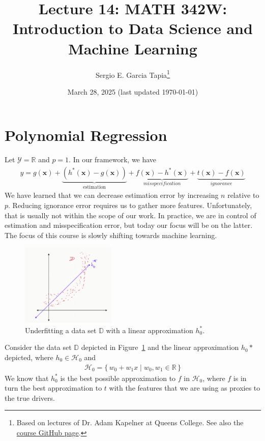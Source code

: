 \documentclass[12pt, a4paper]{article}
\title{Lecture 14: MATH 342W: Introduction to Data Science and Machine Learning}
\author{Sergio E. Garcia Tapia\thanks{Based on lectures of Dr. Adam Kapelner at Queens College.
See also the \href{https://github.com/kapelner/QC_MATH_342W_Spring_2025}{course GitHub page}.}}
\date{March 28, 2025 (last updated \today)}
\theoremstyle{definition}
\begin{document}
	\maketitle
	\section*{Polynomial Regression}
	Let $\mathcal{Y}=\mathbb{R}$ and $p=1$. In our framework, we have
	\begin{align*}
		y = g(\bm{x}) + 
		\underbrace{(h^*(\bm{x}) - g(\bm{x}))}_{{\text{estimation}}} + 
		\underbrace{f(\bm{x}) - h^*(\bm{x})}_{\textit{misspecification}} +
		\underbrace{t(\bm{x}) - f(\bm{x})}_{\textit{ignorance}}
	\end{align*}
	We have learned that we can decrease estimation error by increasing $n$ relative
	to $p$. Reducing ignorance error requires us to gather more features. Unfortunately,
	that is usually not within the scope of our work. In practice, we are in control
	of estimation and misspecification error, but today our focus will be on the latter.
	The focus of this course is slowly shifting towards machine learning.
	
	
	\begin{figure}
		\centering
		\includegraphics[width=0.4\textwidth]{underfit-with-linear-function}
		\caption{Underfitting a data set $\mathbb{D}$ with a linear approximation
		$h_0^*$.}
		\label{fig:underfit-D-with-linear}
	\end{figure}
	
	Consider the data set $\mathbb{D}$ depicted in Figure~\ref{fig:underfit-D-with-linear}
	and the linear approximation $h_0*$ depicted, where $h_0\in \mathcal{H}_0$ and
	\begin{align*}
		\mathcal{H}_0 =\{\, w_0+w_1x \mid w_0,w_1\in \mathbb{R}\,\} 
	\end{align*}
	We know that $h_0^*$ is the best possible approximation to $f$ in $\mathcal{H}_0$, where
	$f$ is in turn the best approximation to $t$ with the features that we are using as proxies
	to the true drivers.
	
\end{document}
